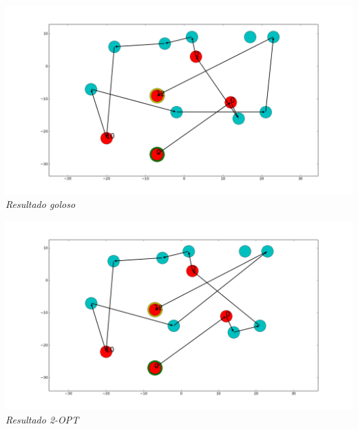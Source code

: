 \vspace*{0.3cm} \vspace*{0.3cm}
  \begin{center}
\includegraphics[scale=0.3]{./EJ5/caminoGoloso.png}
\\{\textit{Resultado goloso}}
  \end{center}
  \vspace*{0.3cm}

  \vspace*{0.3cm} \vspace*{0.3cm}
  \begin{center}
\includegraphics[scale=0.3]{./EJ5/camino2opt.png}
\\{\textit{Resultado 2-OPT}}
  \end{center}
  \vspace*{0.3cm}
  
